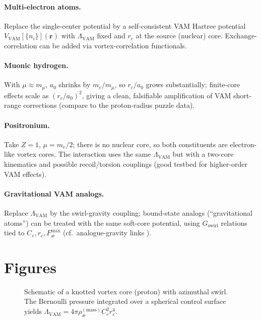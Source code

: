 \documentclass[12pt]{article}
\newcommand{\aeRhoM}{\rho_{\text{\ae}}^{(\text{mass})}}
\newcommand{\Ce}{C_e}
\newcommand{\rc}{r_c}
\newcommand{\Lam}{\Lambda_{\text{VAM}}}
\begin{document}
    \paragraph{Multi-electron atoms.} Replace the single-center potential by a self-consistent VAM Hartree potential \(V_{\text{VAM}}[\{n_i\}](\mathbf r)\) with \(\Lam\) fixed and \(\rc\) at the source (nuclear) core. Exchange-correlation can be added via vortex-correlation functionals.

    \paragraph{Muonic hydrogen.} With \(\mu \approx m_\mu\), \(a_0\) shrinks by \(m_e/m_\mu\), so \(r_c/a_0\) grows substantially; finite-core effects scale as \((r_c/a_0)^2\), giving a clean, falsifiable amplification of VAM short-range corrections (compare to the proton-radius puzzle data).

    \paragraph{Positronium.} Take \(Z=1\), \(\mu=m_e/2\); there is no nuclear core, so both constituents are electron-like vortex cores. The interaction uses the same \(\Lam\) but with a two-core kinematics and possible recoil/torsion couplings (good testbed for higher-order VAM effects).

    \paragraph{Gravitational VAM analogs.} Replace \(\Lam\) by the swirl-gravity coupling; bound-state analogs (``gravitational atoms'') can be treated with the same soft-core potential, using \(G_{\text{swirl}}\) relations tied to \(\Ce,\rc,F_{\text{\ae}}^{\max}\) (cf.\ analogue-gravity links \cite{Barcelo2011}).

    \section*{Figures}

    \begin{figure}[h]
        \centering
        \caption{Schematic of a knotted vortex core (proton) with azimuthal swirl. The Bernoulli pressure integrated over a spherical control surface yields \(\Lam=4\pi\aeRhoM\Ce^2\rc^4\).}
    \end{figure}
\end{document}
